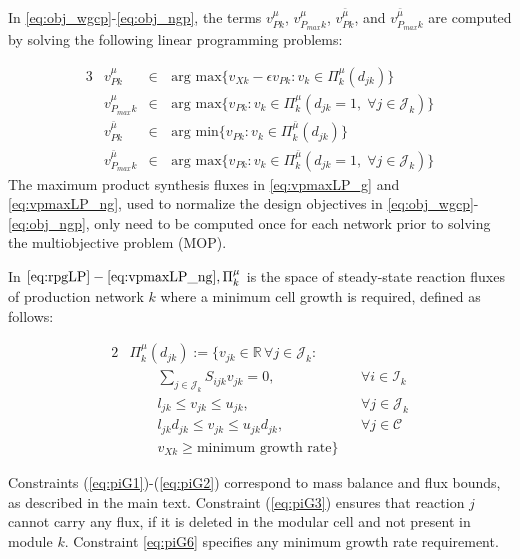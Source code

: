 \noindent In \eqref{eq:obj_wgcp}-\eqref{eq:obj_ngp}, the terms $v_{Pk}^{\mu}$, $v_{P_{max}k}^{\mu}$, $v_{Pk}^{\bar{\mu}}$, and $v_{P_{max}k}^{\bar{\mu}}$ are computed by solving the following linear programming problems:

\begin{alignat}{3}
& v_{Pk}^{\mu} 	&\in& \,	\text{arg }	\underset{}{\text{max}} \{v_{Xk}-\epsilon v_{Pk} : v_k\in \Pi_k^{\mu}(d_{jk})	\} \label{eq:rpgLP}	\\
& v_{P_{max}k}^{\mu} &\in& \,	\text{arg }	\underset{}{\text{max}} \{v_{Pk} : v_k\in \Pi_k^{\mu} (d_{jk} = 1, \; \forall j\in \mathcal{J}_k) 	\}   \label{eq:vpmaxLP_g}	\\
& v_{Pk}^{\bar{\mu}} 	&\in& \,	\text{arg }	\underset{}{\text{min}} \{v_{Pk} : v_k\in \Pi_k^{\bar{\mu}}(d_{jk})\} \label{eq:rpngLP} \\
& v_{P_{max}k}^{\bar{\mu}}&\in& \,	 \text{arg }	\underset{}{\text{max}} \{v_{Pk} : v_k\in \Pi_k^{\bar{\mu}}(d_{jk} = 1, \; \forall j\in \mathcal{J}_k)\}  \label{eq:vpmaxLP_ng}
\end{alignat}
The maximum product synthesis fluxes in \eqref{eq:vpmaxLP_g} and \eqref{eq:vpmaxLP_ng}, used to normalize the design objectives in \eqref{eq:obj_wgcp}-\eqref{eq:obj_ngp}, only need to be computed once for each network prior to solving the multiobjective problem (MOP).

In $\eqref{eq:rpgLP}-\eqref{eq:vpmaxLP_ng}, \Pi_k^{\mu}$ is the space of steady-state reaction fluxes of production network $k$ where a minimum cell growth is required, defined as follows:

\begin{alignat}{2}
	\nonumber	& \Pi_k^{\mu} (d_{jk}):=\{v_{jk}\in\mathbb{R}\, \forall j \in \mathcal{J}_k: \\
		&\qquad	\sum_{j\in \mathcal{J}_k} S_{ijk} v_{jk} =0,  && \forall i\in \mathcal{I}_k 		\label{eq:piG1}\\
		&\qquad l_{jk}  \le v_{jk} \le u_{jk},  && \forall j\in \mathcal{J}_k 					\label{eq:piG2}\\
		&\qquad l_{jk} d_{jk} \le v_{jk} \le u_{jk} d_{jk}, && \forall j\in \mathcal{C} 	\label{eq:piG3}\\
		&\qquad v_{Xk} \ge \text{minimum growth rate}		\label{eq:piG6} \}
\end{alignat}

\noindent Constraints (\ref{eq:piG1})-(\ref{eq:piG2}) correspond to mass balance and flux bounds, as described in the main text. Constraint (\ref{eq:piG3}) ensures that reaction $j$ cannot carry any flux, if it is deleted in the modular cell and not present in module $k$.  Constraint \eqref{eq:piG6} specifies any minimum growth rate requirement.

